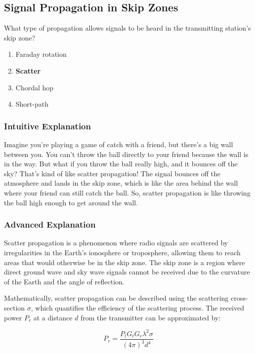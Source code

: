 \subsection{Signal Propagation in Skip Zones}
\label{G3C09}

\begin{tcolorbox}[colback=gray!10!white,colframe=black!75!black,title=G3C09]
What type of propagation allows signals to be heard in the transmitting station’s skip zone?
\begin{enumerate}[label=\Alph*)]
    \item Faraday rotation
    \item \textbf{Scatter}
    \item Chordal hop
    \item Short-path
\end{enumerate}
\end{tcolorbox}

\subsubsection{Intuitive Explanation}
Imagine you're playing a game of catch with a friend, but there's a big wall between you. You can't throw the ball directly to your friend because the wall is in the way. But what if you throw the ball really high, and it bounces off the sky? That's kind of like scatter propagation! The signal bounces off the atmosphere and lands in the skip zone, which is like the area behind the wall where your friend can still catch the ball. So, scatter propagation is like throwing the ball high enough to get around the wall.

\subsubsection{Advanced Explanation}
Scatter propagation is a phenomenon where radio signals are scattered by irregularities in the Earth's ionosphere or troposphere, allowing them to reach areas that would otherwise be in the skip zone. The skip zone is a region where direct ground wave and sky wave signals cannot be received due to the curvature of the Earth and the angle of reflection.

Mathematically, scatter propagation can be described using the scattering cross-section \(\sigma\), which quantifies the efficiency of the scattering process. The received power \(P_r\) at a distance \(d\) from the transmitter can be approximated by:

\[
P_r = \frac{P_t G_t G_r \lambda^2 \sigma}{(4\pi)^3 d^4}
\]

